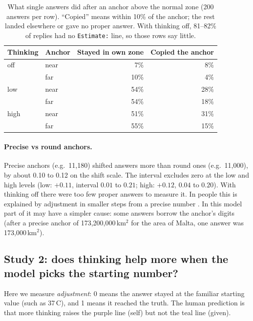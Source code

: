 \documentclass[11pt,a4paper]{article}
\begin{document}
\begin{table}[ht]
\centering
\small
\begin{tabular}{llrr}
\toprule
Thinking & Anchor & Stayed in own zone & Copied the anchor \\
\midrule
off  & near & 7\% & 8\% \\
     & far  & 10\% & 4\% \\
low  & near & 54\% & 28\% \\
     & far  & 54\% & 18\% \\
high & near & 51\% & 31\% \\
     & far  & 55\% & 15\% \\
\bottomrule
\end{tabular}
\caption{What single answers did after an anchor above the normal zone (200 answers per row). \enquote{Copied} means within 10\% of the anchor; the rest landed elsewhere or gave no proper answer. With thinking off, 81--82\% of replies had no \texttt{Estimate:} line, so those rows say little.}
\label{tab:copies}
\end{table}

\paragraph{Precise vs round anchors.} Precise anchors (e.g.\ 11,180) shifted answers more than round ones (e.g.\ 11,000), by about 0.10 to 0.12 on the shift scale. The interval excludes zero at the low and high levels (low: $+0.11$, interval $0.01$ to $0.21$; high: $+0.12$, $0.04$ to $0.20$). With thinking off there were too few proper answers to measure it. In people this is explained by adjustment in smaller steps from a precise number \citep{janiszewski2008precision}. In this model part of it may have a simpler cause: some answers borrow the anchor's digits (after a precise anchor of 173,200,000\,km$^2$ for the area of Malta, one answer was 173,000\,km$^2$).

\subsection{Study 2: does thinking help more when the model picks the starting number?}

Here we measure \emph{adjustment}: 0 means the answer stayed at the familiar starting value (such as 37\,\textdegree C), and 1 means it reached the truth. The human prediction \citep{epley2005effortful} is that more thinking raises the purple line (self) but not the teal line (given).
\end{document}
